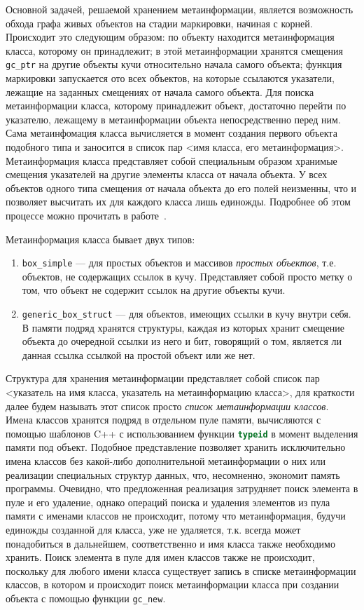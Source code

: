 Основной задачей, решаемой хранением метаинформации, является возможность обхода графа живых объектов на стадии маркировки,
начиная с корней. Происходит это следующим образом: по объекту находится метаинформация класса, которому он принадлежит;
в этой метаинформации хранятся смещения \lstinline[language= cpp]{gc_ptr} на другие объекты кучи относительно начала
самого объекта; функция маркировки запускается ото всех объектов, на которые ссылаются указатели,
лежащие на заданных смещениях от начала самого объекта.
Для поиска метаинформации класса, которому принадлежит объект, достаточно перейти по указателю, лежащему в метаинформации
объекта непосредственно перед ним.
Сама метаинфомация класса вычисляется в момент создания первого объекта подобного типа и заносится в список пар
<имя класса, его метаинформация>. Метаинформация класса представляет собой специальным образом хранимые смещения
указателей на другие элементы класса от начала объекта. У всех объектов одного типа смещения от начала объекта до его полей
неизменны, что и позволяет высчитать их для каждого класса лишь единожды.
Подробнее об этом процессе можно прочитать в работе~\cite{kren}.

Метаинформация класса бывает двух типов:
\begin{enumerate}
\item \lstinline[language= cpp]{box_simple} --- для простых объектов и массивов \textit{простых объектов},
	т.е. объектов, не содержащих ссылок в кучу. Представляет собой просто метку о том, что объект не содержит ссылок на другие
	объекты кучи.
\item \lstinline[language= cpp]{generic_box_struct} --- для объектов, имеющих ссылки в кучу внутри себя.
	В памяти подряд хранятся структуры, каждая из которых хранит смещение объекта до очередной ссылки из него и бит,
	говорящий о том, является ли данная ссылка ссылкой на простой объект или же нет.
\end{enumerate}
Структура для хранения метаинформации представляет собой список пар <указатель на имя класса, указатель на метаинформацию класса>,
для краткости далее будем называть этот список просто \textit{список метаинформации классов}.
Имена классов хранятся подряд в отдельном пуле памяти, вычисляются с помощью шаблонов C++ с использованием
функции \lstinline[language= cpp]{typeid} в момент выделения памяти под объект.
Подобное представление позволяет хранить исключительно имена классов без какой-либо дополнительной метаинформации о них
или реализации специальных структур данных, что, несомненно, экономит память программы.
Очевидно, что предложенная реализация затрудняет поиск элемента в пуле и его удаление, однако
операций поиска и удаления элементов из пула памяти с именами классов не происходит, потому что метаинформация,
будучи единожды созданной для класса, уже не удаляется, т.к. всегда может понадобиться в дальнейшем, соответственно
и имя класса также необходимо хранить. Поиск элемента в пуле для имен классов также не происходит,
поскольку для любого имени класса существует запись в списке метаинформации классов, в котором и происходит
поиск метаинформации класса при создании объекта с помощью функции \lstinline[language= cpp]{gc_new}.

